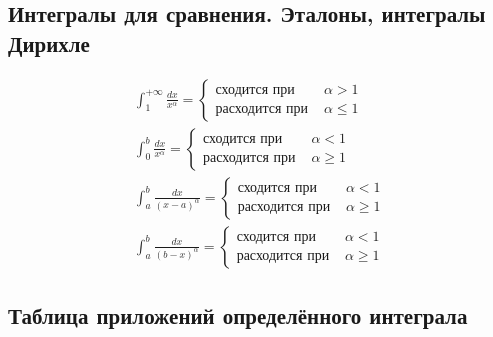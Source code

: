 \subsection{Интегралы для сравнения. Эталоны, интегралы Дирихле}
\begin{gather*}
    \boxed{\int_{1}^{+\infty} \frac{dx}{x^\alpha} = \left\{ \begin{aligned}
        \text{сходится при } &\alpha > 1 \\
        \text{расходится при } &\alpha \leqslant 1
    \end{aligned} \right.} \\[1ex]
    \boxed{\int_{0}^{b} \frac{dx}{x^\alpha} = \left\{ \begin{aligned}
        \text{сходится при } &\alpha < 1 \\
        \text{расходится при } &\alpha \geqslant 1
    \end{aligned} \right. } \\[1ex]
    \boxed{\int_{a}^{b} \frac{dx}{(x - a)^\alpha} = \left\{ \begin{aligned}
        \text{сходится при } &\alpha < 1 \\
        \text{расходится при } &\alpha \geqslant 1
    \end{aligned} \right.} \\[1ex]
    \boxed{\int_{a}^{b} \frac{dx}{(b - x)^\alpha} = \left\{ \begin{aligned}
        \text{сходится при } &\alpha < 1 \\
        \text{расходится при } &\alpha \geqslant 1
    \end{aligned} \right. }
\end{gather*}

\newpage
\subsection{Таблица приложений определённого интеграла}

